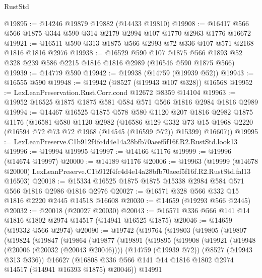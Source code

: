 \begin{lexlean}{RustStd}
\begin{coremodule}
@19895 := @14246 @19879 @19882 (@14433 @19810)
@19908 := @16417 @566 @566 @1875 @344 @590 @314 @2179 @2994 @107 @1770 @2963 @1776 @16672
@19921 := @16511 @590 @313 @1875 @566 @2993 @72 @336 @107 @571 @2168 @1816 @1816 @2976
@19938 := @16529
    @590
    @107
    @1875
    @566
    @1893
    @52
    @328
    @239
    @586
    @2215
    @1816
    @1816
    @2989
    (@16546 @590 @1875 @566)
@19939 := @14779 @590
@19942 := @19938 (@14759 (@19939 @52))
@19943 := @16555 @590
@19948 := @19942 (@8527 (@19943 @107 @328)) @16568
@19952 := LexLeanPreservation.Rust.Corr.cond @12672 @8359 @14104
@19963 := @19952 @16525 @1875 @1875 @581 @584 @571 @566 @1816 @2984 @1816 @2989
@19994 := @14467
    @16525
    @1875
    @578
    @580
    @1120
    @207
    @1816
    @2982
    @1875
    @1176
    (@16581
      @580
      @1120
      @2982
      (@16586
        @129
        @332
        @73
        @15
        @1968
        @2220
        (@16594 @72 @73 @72 @1968 (@14545 (@16599 @72)) @15399)
        @16607))
@19995 := LexLeanPreserve.C1b912f4fc4d4e14a28bfb70aeef5f16f.R2.RustStd.look13
@19996 := @19994 @19995
@19997 := @14166 @1176
@19999 := @19996 (@14674 @19997)
@20000 := @14189 @1176
@20006 := @19963
    (@19999
      (@14678 @20000)
      LexLeanPreserve.C1b912f4fc4d4e14a28bfb70aeef5f16f.R2.RustStd.fal13
      @16503)
@20018 := @15334 @16525 @1875 @1875 @15338 @2984 @584 @571 @566 @1816 @2986 @1816 @2976
@20027 := @16571 @328 @566 @332 @15 @1816 @2220 @2445 @14518 @16608
@20030 := @14659 (@19293 @566 @2445)
@20032 := @20018 (@20027 @20030)
@20043 := @16571 @336 @566 @141 @14 @1816 @1802 @2974 @14517 (@14941 @16525 @1875)
@20046 := @14659 (@19332 @566 @2974)
@20090 := @19742
    (@19764
      (@19803
        (@19805
          (@19807
            (@19824
              (@19847
                (@19864
                  (@19877
                    (@19891
                      (@19895
                        (@19908
                          (@19921
                            (@19948 (@20006 (@20032 (@20043 @20046))))
                            (@14759 (@19939 @72))
                            (@8527 (@19943 @313 @336))
                            @16627
                            (@16808
                              @336
                              @566
                              @141
                              @14
                              @1816
                              @1802
                              @2974
                              @14517
                              (@14941 @16393 @1875)
                              @20046))
                          @14991

\end{coremodule}
\end{lexlean}
